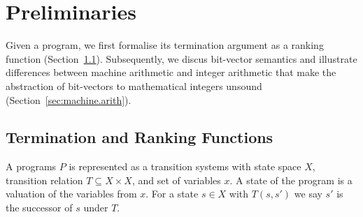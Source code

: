 \documentclass[preprint]{sigplanconf}
\theoremstyle{definition}
\begin{document}





\section{Preliminaries}
Given a program, %
we first formalise its termination argument as a ranking function (Section~\ref{sec:ranking.functions}). 
Subsequently, we discus bit-vector semantics and illustrate 
differences between machine arithmetic and integer arithmetic that
make the abstraction of bit-vectors to mathematical integers unsound (Section~\ref{sec:machine.arith}).



\subsection{Termination and Ranking Functions} \label{sec:ranking.functions}
A programs $P$ is represented as a transition systems with state space $X$, transition relation $T \subseteq X \times X$, and set of variables $x$. 
A state of the program is a valuation of the variables from $x$. For a state $s \in X$ with $T(s,s')$ we say $s'$
is the successor of $s$ under $T$. 
\end{document}
